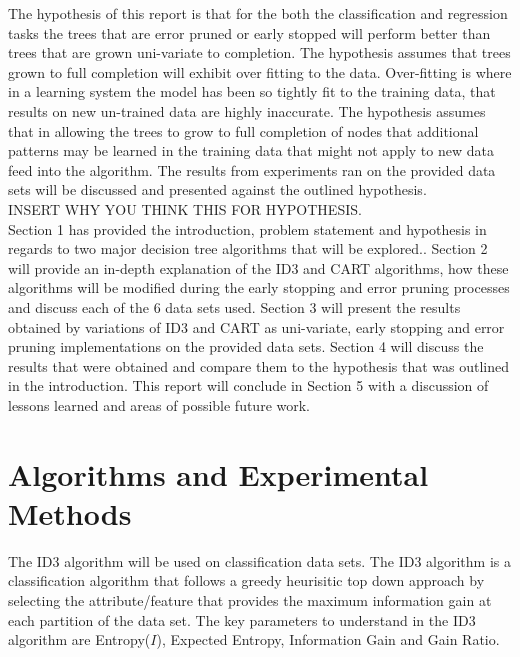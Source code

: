 \documentclass[twoside,11pt]{article}
\begin{document}
\hspace*{5mm} The hypothesis of this report is that for the both the classification and regression tasks the trees that are error pruned or early stopped will perform better than trees that are grown uni-variate to completion. The hypothesis assumes that trees grown to full completion will exhibit over fitting to the data. Over-fitting is where in a learning system the model has been so tightly fit to the training data, that results on new un-trained data are highly inaccurate. The hypothesis assumes that in allowing the trees to grow to full completion of nodes that additional patterns may be learned in the training data that might not apply to new data feed into the algorithm. The results from experiments ran on the provided data sets will be discussed and presented against the outlined hypothesis.\\

INSERT WHY YOU THINK THIS FOR HYPOTHESIS.\\

\hspace*{5mm} Section 1 has provided the introduction, problem statement and hypothesis in regards to two major decision tree algorithms that will be explored.. Section 2 will provide an in-depth explanation of the ID3 and CART algorithms, how these algorithms will be modified during the early stopping and error pruning processes and discuss each of the 6 data sets used. Section 3 will present the results obtained by variations of ID3 and CART as uni-variate, early stopping and error pruning implementations on the provided data sets. Section 4 will discuss the results that were obtained and compare them to the hypothesis that was outlined in the introduction. This report will conclude in Section 5 with a discussion of lessons learned and areas of possible future work.\\


\section{Algorithms and Experimental Methods}
\hspace*{10mm} The ID3 algorithm will be used on classification data sets. The ID3 algorithm is a classification algorithm that follows a greedy heurisitic top down approach by selecting the attribute/feature that provides the maximum information gain at each partition of the data set. The key parameters to understand in the ID3 algorithm are Entropy($I$), Expected Entropy, Information Gain and Gain Ratio.\\
\end{document}
